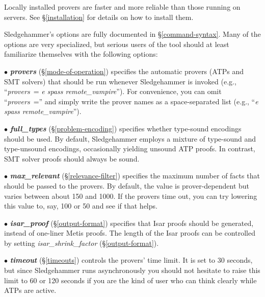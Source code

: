 \documentclass[a4paper,12pt]{article}
\begin{document}

Locally installed provers are faster and more reliable than those running on
servers. See \S\ref{installation} for details on how to install them.


Sledgehammer's options are fully documented in \S\ref{command-syntax}. Many of
the options are very specialized, but serious users of the tool should at least
familiarize themselves with the following options:

\begin{enum}
\item[$\bullet$] \textbf{\textit{provers}} (\S\ref{mode-of-operation}) specifies
the automatic provers (ATPs and SMT solvers) that should be run whenever
Sledgehammer is invoked (e.g., ``\textit{provers}~= \textit{e spass
remote\_vampire}''). For convenience, you can omit ``\textit{provers}~=''
and simply write the prover names as a space-separated list (e.g., ``\textit{e
spass remote\_vampire}'').

\item[$\bullet$] \textbf{\textit{full\_types}} (\S\ref{problem-encoding})
specifies whether type-sound encodings should be used. By default, Sledgehammer
employs a mixture of type-sound and type-unsound encodings, occasionally
yielding unsound ATP proofs. In contrast, SMT solver proofs should always be
sound.

\item[$\bullet$] \textbf{\textit{max\_relevant}} (\S\ref{relevance-filter})
specifies the maximum number of facts that should be passed to the provers. By
default, the value is prover-dependent but varies between about 150 and 1000. If
the provers time out, you can try lowering this value to, say, 100 or 50 and see
if that helps.

\item[$\bullet$] \textbf{\textit{isar\_proof}} (\S\ref{output-format}) specifies
that Isar proofs should be generated, instead of one-liner Metis proofs. The
length of the Isar proofs can be controlled by setting
\textit{isar\_shrink\_factor} (\S\ref{output-format}).

\item[$\bullet$] \textbf{\textit{timeout}} (\S\ref{timeouts}) controls the
provers' time limit. It is set to 30 seconds, but since Sledgehammer runs
asynchronously you should not hesitate to raise this limit to 60 or 120 seconds
if you are the kind of user who can think clearly while ATPs are active.
\end{enum}
\end{document}
